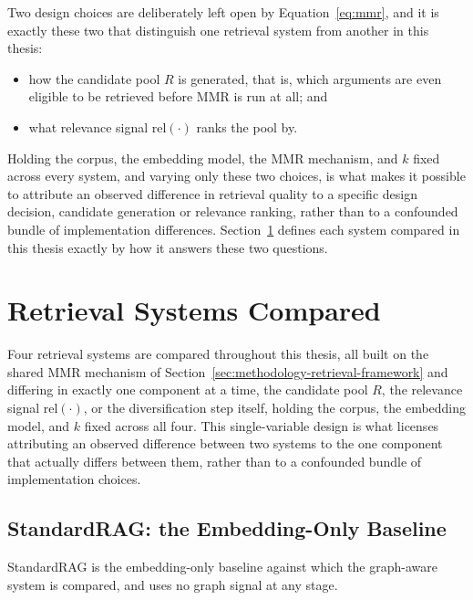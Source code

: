 Two design choices are deliberately left open by Equation~\ref{eq:mmr}, and it is exactly these
two that distinguish one retrieval system from another in this thesis:

\begin{itemize}
\item how the candidate pool $R$ is generated, that is, which arguments are even eligible to be
retrieved before MMR is run at all; and

\item what relevance signal $\mathrm{rel}(\cdot)$ ranks the pool by.
\end{itemize}

Holding the corpus, the embedding model, the MMR mechanism, and $k$ fixed across every system, and
varying only these two choices, is what makes it possible to attribute an observed difference in
retrieval quality to a specific design decision, candidate generation or relevance ranking, rather
than to a confounded bundle of implementation differences. Section~\ref{sec:methodology-systems}
defines each system compared in this thesis exactly by how it answers these two questions.

\section{Retrieval Systems Compared}
\label{sec:methodology-systems}

Four retrieval systems are compared throughout this thesis, all built on the shared MMR mechanism
of Section~\ref{sec:methodology-retrieval-framework} and differing in exactly one component at a
time, the candidate pool $R$, the relevance signal $\mathrm{rel}(\cdot)$, or the diversification
step itself, holding the corpus, the embedding model, and $k$ fixed across all four. This
single-variable design is what licenses attributing an observed difference between two systems to
the one component that actually differs between them, rather than to a confounded bundle of
implementation choices.

\subsection{StandardRAG: the Embedding-Only Baseline}
\label{sec:methodology-standardrag}

StandardRAG is the embedding-only baseline against which the graph-aware system is compared, and
uses no graph signal at any stage.

